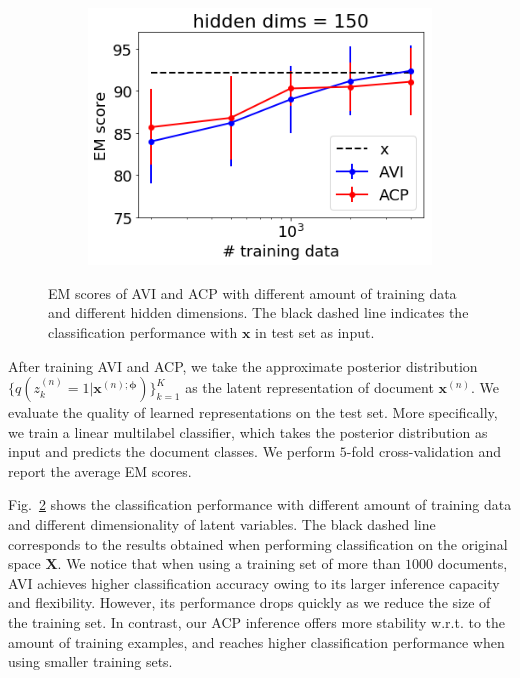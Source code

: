 \documentclass[twoside]{article}
\newcommand{\bX}{\mathbf{X}}
\newcommand{\bx}{\mathbf{x}}
\newcommand{\bphi}{\bm{\phi}}
\begin{document}
\begin{figure}
\begin{subfigure}[t]{0.33\textwidth}
        \includegraphics[width=1.0\linewidth]{reuters_cl_h150.png}
        \caption{}
        \label{fig: reuters_h150}
    \end{subfigure}
    
\caption{\small EM scores of AVI and ACP with different amount of training data and different hidden dimensions. The black dashed line indicates the classification performance with $\bx$ in test set as input.}
\label{fig: reuters_em}
\end{figure}


After training AVI and ACP, we take the approximate posterior distribution $\big\{q(z_k^{(n)}=1|\bx^{(n); \bphi})\big\}_{k=1}^K$ as the latent representation of document $\bx^{(n)}$.
We evaluate the quality of learned representations on the test set. More specifically, we train a linear multilabel classifier, which takes the posterior distribution as input and predicts the document classes. We perform $5$-fold cross-validation and report the average EM scores. 

Fig.~\ref{fig: reuters_em} shows the classification performance with different amount of training data and different dimensionality of latent variables.  The black dashed line corresponds to the results obtained when performing classification on the original space $\bX$. 
We notice that when using  a training set of more than $1000$ documents, AVI achieves higher classification accuracy owing to its larger inference capacity and flexibility. However, its performance drops quickly as we reduce the size of the training set. In contrast, our ACP inference offers more stability w.r.t. to the amount of training examples, and reaches higher classification performance when using smaller training sets. 
\end{document}
